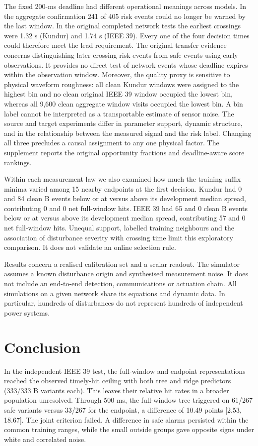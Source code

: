 \documentclass[10pt]{article}
\begin{document}
The fixed 200-ms deadline had different operational meanings across models. In the aggregate confirmation 241 of 405 risk events could no longer be warned by the last window. In the original completed network tests the earliest crossings were 1.32 s (Kundur) and 1.74 s (IEEE 39). Every one of the four decision times could therefore meet the lead requirement. The original transfer evidence concerns distinguishing later-crossing risk events from safe events using early observations. It provides no direct test of network events whose deadline expires within the observation window. Moreover, the quality proxy is sensitive to physical waveform roughness: all clean Kundur windows were assigned to the highest bin and no clean original IEEE 39 window occupied the lowest bin, whereas all 9,600 clean aggregate window visits occupied the lowest bin. A bin label cannot be interpreted as a transportable estimate of sensor noise. The source and target experiments differ in parameter support, dynamic structure, and in the relationship between the measured signal and the risk label. Changing all three precludes a causal assignment to any one physical factor. The supplement reports the original opportunity fractions and deadline-aware score rankings.

Within each measurement law we also examined how much the training suffix minima varied among 15 nearby endpoints at the first decision. Kundur had 0 and 84 clean B events below or at versus above its development median spread, contributing 0 and 0 net full-window hits. IEEE 39 had 65 and 0 clean B events below or at versus above its development median spread, contributing 57 and 0 net full-window hits. Unequal support, labelled training neighbours and the association of disturbance severity with crossing time limit this exploratory comparison. It does not validate an online selection rule.

Results concern a realised calibration set and a scalar readout. The simulator assumes a known disturbance origin and synthesised measurement noise. It does not include an end-to-end detection, communications or actuation chain. All simulations on a given network share its equations and dynamic data. In particular, hundreds of disturbances do not represent hundreds of independent power systems.

\section{Conclusion}
In the independent IEEE 39 test, the full-window and endpoint representations reached the observed timely-hit ceiling with both tree and ridge predictors (333/333 B variants each). This leaves their relative hit rates in a broader population unresolved. Through 500 ms, the full-window tree triggered on 61/267 safe variants versus 33/267 for the endpoint, a difference of 10.49 points [2.53, 18.67]. The joint criterion failed. A difference in safe alarms persisted within the common training ranges, while the small outside groups gave opposite signs under white and correlated noise.
\end{document}

